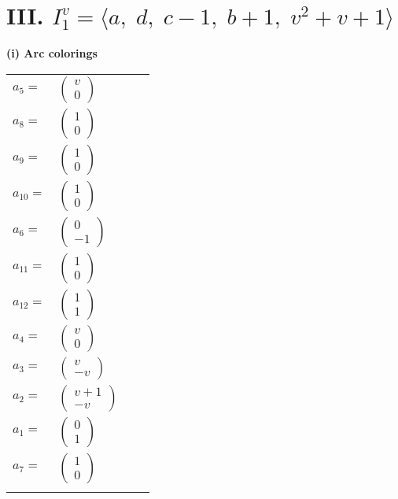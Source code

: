 \documentclass[1p]{elsarticle_modified}
\theoremstyle{definition}
\begin{document}
\centering \section*{III. $I^v_{1}= \langle a,\;d,\;c-1,\;b+1,\;v^2+v+1 \rangle$}
\flushleft \textbf{(i) Arc colorings}\\
\begin{tabular}{m{7pt} m{180pt} m{7pt} m{180pt} }
\flushright $a_{5}=$&$\begin{pmatrix}v\\0\end{pmatrix}$ \\
\flushright $a_{8}=$&$\begin{pmatrix}1\\0\end{pmatrix}$ \\
\flushright $a_{9}=$&$\begin{pmatrix}1\\0\end{pmatrix}$ \\
\flushright $a_{10}=$&$\begin{pmatrix}1\\0\end{pmatrix}$ \\
\flushright $a_{6}=$&$\begin{pmatrix}0\\-1\end{pmatrix}$ \\
\flushright $a_{11}=$&$\begin{pmatrix}1\\0\end{pmatrix}$ \\
\flushright $a_{12}=$&$\begin{pmatrix}1\\1\end{pmatrix}$ \\
\flushright $a_{4}=$&$\begin{pmatrix}v\\0\end{pmatrix}$ \\
\flushright $a_{3}=$&$\begin{pmatrix}v\\- v\end{pmatrix}$ \\
\flushright $a_{2}=$&$\begin{pmatrix}v+1\\- v\end{pmatrix}$ \\
\flushright $a_{1}=$&$\begin{pmatrix}0\\1\end{pmatrix}$ \\
\flushright $a_{7}=$&$\begin{pmatrix}1\\0\end{pmatrix}$\\&\end{tabular}
\end{document}
